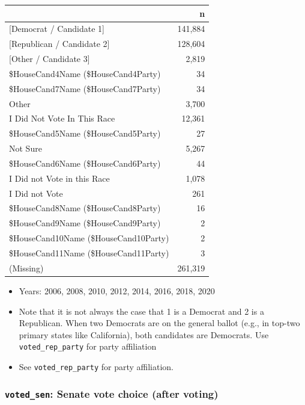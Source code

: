 \documentclass[10pt,article,oneside]{memoir}
\theoremstyle{definition}
\begin{document}
\begin{table}[H]
\centering
\begin{tabular}[t]{lr}
\toprule
 & n\\
\midrule
{}{[Democrat / Candidate 1]} & 141,884\\
{}{[Republican / Candidate 2]} & 128,604\\
{}{[Other / Candidate 3]} & 2,819\\
\$HouseCand4Name (\$HouseCand4Party) & 34\\
\$HouseCand7Name (\$HouseCand7Party) & 34\\
Other & 3,700\\
I Did Not Vote In This Race & 12,361\\
\$HouseCand5Name (\$HouseCand5Party) & 27\\
Not Sure & 5,267\\
\$HouseCand6Name (\$HouseCand6Party) & 44\\
I Did not Vote in this Race & 1,078\\
I Did not Vote & 261\\
\$HouseCand8Name (\$HouseCand8Party) & 16\\
\$HouseCand9Name (\$HouseCand9Party) & 2\\
\$HouseCand10Name (\$HouseCand10Party) & 2\\
\$HouseCand11Name (\$HouseCand11Party) & 3\\
(Missing) & 261,319\\
\bottomrule
\end{tabular}
\end{table}

\begin{itemize}
\tightlist
\item
  Years: 2006, 2008, 2010, 2012, 2014, 2016, 2018, 2020
\item
  Note that it is not always the case that 1 is a Democrat and 2 is a
  Republican. When two Democrats are on the general ballot (e.g., in
  top-two primary states like California), both candidates are
  Democrats. Use \texttt{voted\_rep\_party} for party affiliation
\item
  See \texttt{voted\_rep\_party} for party affiliation.
\end{itemize}

\hypertarget{voted_sen-senate-vote-choice-after-voting}{%
\subsubsection{\texorpdfstring{\texttt{voted\_sen}: Senate vote choice
(after
voting)}{voted\_sen: Senate vote choice (after voting)}}\label{voted_sen-senate-vote-choice-after-voting}}
\end{document}
